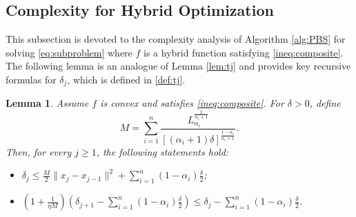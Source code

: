\documentclass[11pt,letterpaper]{article}
\newtheorem{lemma}[thm]{Lemma}
\begin{document}
\subsection{Complexity for Hybrid Optimization}\label{subsec:composite-OPT}


This subsection is devoted to the complexity analysis of Algorithm \ref{alg:PBS} for solving \eqref{eq:subproblem} where $f$ is a hybrid function satisfying \eqref{ineq:composite}.
The following lemma is an analogue of Lemma \ref{lem:tj} and provides key recursive formulas for $\delta_j$, which is defined in \eqref{def:tj}.


\begin{lemma}\label{lem:tj1}
Assume $f$ is convex and satisfies \eqref{ineq:composite}. For $\delta>0$, define
\begin{equation}\label{def:M}
    M= \sum_{i=1}^n \frac{L_{\alpha_i}^{\frac{2}{\alpha_i+1}} }{ [(\alpha_i+1)\delta]^{\frac{1-\alpha_i}{\alpha_i+1}} }.
\end{equation}
Then, for every $j\ge 1$, the following statements hold:
\begin{itemize}
    \item[a)] $\delta_j \le \frac M2 \|x_j-x_{j-1}\|^2 + \sum_{i=1}^n(1-\alpha_i) \frac{\delta}2$; 
    \item[b)] $\left(1+\frac{1}{\eta M}\right)\left(\delta_{j+1} - \sum_{i=1}^n(1-\alpha_i)\frac{\delta}{2}\right)\le \delta_j- \sum_{i=1}^n(1-\alpha_i) \frac{\delta}{2}$.
\end{itemize}
\end{lemma}
\end{document}
